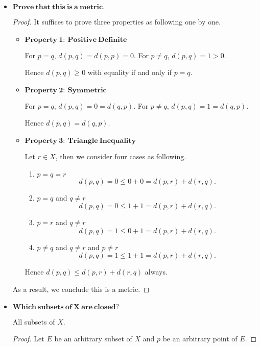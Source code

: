 \begin{Exercise}
	\begin{itemize}
		\item $\mathbf{Prove\ that\ this\ is\ a\ metric.}$
		\begin{proof}
			It suffices to prove three properties as following one by one.
			\begin{itemize}
				\item $\mathbf{Property\ 1:\ Positive\ Definite}$
				
				For $p=q$, $d(p,q) = d(p,p) = 0$. For $p\neq q$, $d(p,q) = 1 > 0$.
				
				Hence $d(p,q)\geq 0$ with equality if and only if $p=q$.
				
				\item $\mathbf{Property\ 2:\ Symmetric}$
				
				For $p=q$, $d(p,q) = 0 = d(q,p)$. For $p\neq q$, $d(p,q) = 1 = d(q,p)$.
				
				Hence $d(p,q) = d(q,p)$.
				
				\item $\mathbf{Property\ 3:\ Triangle\ Inequality}$
				
				Let $r\in X$, then we consider four cases as following.
				
				\begin{enumerate}
					\item $p=q=r$
					$$
					d(p,q) = 0 \leq 0 + 0 = d(p,r) + d(r,q).
					$$
					
					\item $p=q$ and $q\neq r$
					$$
					d(p,q) = 0 \leq 1 + 1 = d(p,r) + d(r,q).
					$$
					
					\item $p=r$ and $q\neq r$
					$$
					d(p,q) = 1 \leq 0 + 1 = d(p,r) + d(r,q).
					$$
					
					\item $p\neq q$ and $q\neq r$ and $p \neq r$
					$$
					d(p,q) = 1 \leq 1 + 1 = d(p,r) + d(r,q).
					$$
				\end{enumerate}
				
				Hence $d(p,q) \leq d(p,r) + d(r,q)$ always.
			\end{itemize}
			
			As a result, we conclude this is a metric.
		\end{proof}
		
		\item $\mathbf{Which\ subsets\ of\ X\ are\ closed?}$
		\begin{answer}
			All subsets of $X$.
		\end{answer}
		\begin{proof}
			Let $E$ be an arbitrary subset of $X$ and $p$ be an arbitrary point of $E$. 
			

\end{proof}
\end{itemize}
\end{Exercise}
